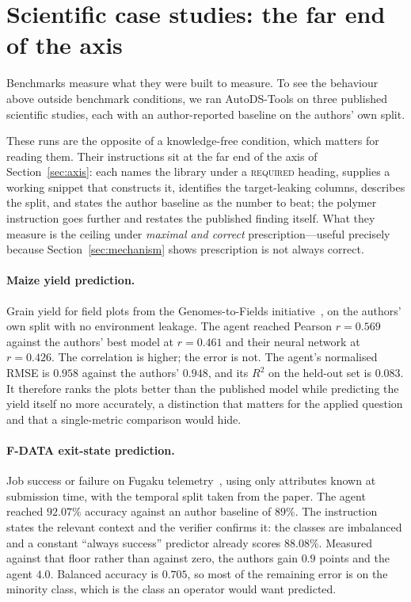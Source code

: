 \section{Scientific case studies: the far end of the axis}
\label{sec:cases}

Benchmarks measure what they were built to measure. To see the behaviour above
outside benchmark conditions, we ran AutoDS-Tools on three published scientific
studies, each with an author-reported baseline on the authors' own split.

These runs are the opposite of a knowledge-free condition, which matters for
reading them. Their instructions sit at the far end of the axis of
Section~\ref{sec:axis}: each names the library under a \textsc{required} heading,
supplies a working snippet that constructs it, identifies the target-leaking
columns, describes the split, and states the author baseline as the number to
beat; the polymer instruction goes further and restates the published finding
itself. What they measure is the ceiling under \emph{maximal and correct}
prescription---useful precisely because Section~\ref{sec:mechanism} shows
prescription is not always correct.

\paragraph{Maize yield prediction.} Grain yield for field plots from the
Genomes-to-Fields initiative~\citep{kick2023yield}, on the authors' own split
with no environment leakage. The agent reached Pearson $r = 0.569$ against the authors' best model
at $r = 0.461$ and their neural network at $r = 0.426$. The correlation is
higher; the error is not. The agent's normalised RMSE is $0.958$
against the authors' $0.948$, and its $R^2$ on the held-out set is $0.083$. It
therefore ranks the plots better than the published model while predicting the
yield itself no more accurately, a distinction that matters for the applied
question and that a single-metric comparison would hide.

\paragraph{F-DATA exit-state prediction.} Job success or failure on Fugaku
telemetry~\citep{antici2025fdata}, using only attributes known at submission
time, with the temporal split taken from the paper. The agent reached $92.07\%$ accuracy against an
author baseline of $89\%$. The instruction states the relevant context and the
verifier confirms it: the classes are imbalanced and a constant
``always success'' predictor already scores $88.08\%$. Measured against that
floor rather than against zero, the authors gain $0.9$ points and the agent
$4.0$. Balanced accuracy is $0.705$, so most of the remaining error is on the
minority class, which is the class an operator would want predicted.

